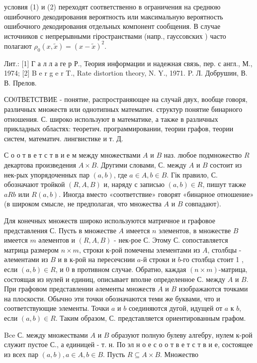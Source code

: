 \documentclass[10pt]{article}
\begin{document}
условия (1) и (2) переходят соответственно в ограничения на среднюю ошибочного декодирования вероятность или максимальную вероятность ошибочного декодирования отдельных компонент сообщения. В случае источников с непрерывными гіространствами (напр., гауссовских ) часто полагают $\rho_{0}(x, \tilde{x})=(x-\tilde{x})^{2}$.



Лит.: [1] Г а л л а ге р Р., Теория информации и надежная связь, пер. с англ., М., 1974; [2] B e r g e r T., Rate distortion theory, N. Y., 1971. P. Л. Добрушин, В. В. Прелов.



СО0ТВЕТСТВИЕ - понятие, распространяющее на случай двух, вообще говоря, различных множеств или однотипных математич. структур понятие бинарного отношения. С. широко используют в математике, а также в различных прикладных областях: теоретич. программировании, теории графов, теории систем, математич. лингвистике и т. Д.



С о о т в е т с т в и е м между множествами $A$ и $B$ наз. любое подмножество $R$ декартова произведения $A \times B$. Другими словами, С. между $A$ и $B$ состоит из нек-рых упорядоченных пар $(a, b)$, где $a \in A, b \in B$. Гік правило, С. обозначают тройкой $(R, A, B)$ и, наряду с записью $(a, b) \in R$, пишут также $a R b$ или $R(a, b)$. Иногда вместо «соответствие» говорят «бинарное отношение» (в широком смысле, не предполагая, что множества $A$ и $B$ совпадают).



Для конечных множеств широко используются матричное и графовое представления С. Пусть в множестве $A$ имеется $n$ элементов, в множестве $B$ имеется $m$ әлементов и $(R, A, B)$ - нек-рое С. Этому С. сопоставляется матрица размером $n \times m$, строки к-рой помечены элементами из $A$, столбцы - әлементами из $B$ и в к-рой на пересечснии $a$-й строки и $b$-го столбца стоит 1 , если $(a, b) \in R$, и 0 в противном случае. Обратно, каждая $(n \times m)$-матрица, состоящая из нулей и единиц, описывает вполне определенное С. между $A$ и $B$. При графовом представлении әлементы множеств $A$ и $B$ изображаются точками на плоскости. Обычно эти точки обозначаются теми же буквами, что и соответствующие элементы. Точки $a$ и $b$ соединяются дугой, идущей от $a$ к $b$, если $(a, b) \in R$. Таким образом, С. представляется ориентированным графом.



Bce С. между множествами $A$ и $B$ образуют полную булеву алгебру, нулем к-рой служит пустое С., а единицей - т. н. По эл н о е с о о т в е т с т в и е, состоящее из всех пар $(a, b), a \in A, b \in B$. Пусть $R \subseteq A \times B$. Множество
\end{document}
